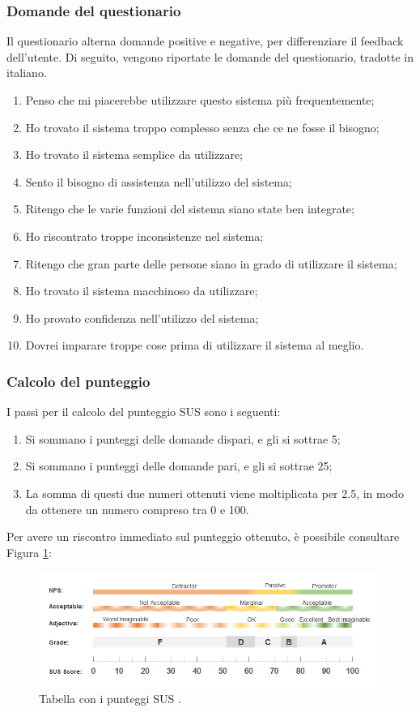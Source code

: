 \subsubsection{Domande del questionario}
Il questionario alterna domande positive e negative, per differenziare il feedback dell'utente.
Di seguito, vengono riportate le domande del questionario, tradotte in italiano.
\begin{enumerate}
  \item Penso che mi piacerebbe utilizzare questo sistema più frequentemente;
  \item Ho trovato il sistema troppo complesso senza che ce ne fosse il bisogno;
  \item Ho trovato il sistema semplice da utilizzare;
  \item Sento il bisogno di assistenza nell'utilizzo del sistema;
  \item Ritengo che le varie funzioni del sistema siano state ben integrate;
  \item Ho riscontrato troppe inconsistenze nel sistema;
  \item Ritengo che gran parte delle persone siano in grado di utilizzare il sistema;
  \item Ho trovato il sistema macchinoso da utilizzare;
  \item Ho provato confidenza nell'utilizzo del sistema;
  \item Dovrei imparare troppe cose prima di utilizzare il sistema al meglio.
\end{enumerate}

\subsubsection{Calcolo del punteggio}
I passi per il calcolo del punteggio SUS sono i seguenti:
\begin{enumerate}
  \item Si sommano i punteggi delle domande dispari, e gli si sottrae 5;
  \item Si sommano i punteggi delle domande pari, e gli si sottrae 25;
  \item La somma di questi due numeri ottenuti viene moltiplicata per 2.5, in modo da ottenere un numero compreso tra 0 e 100.
\end{enumerate}
Per avere un riscontro immediato sul punteggio ottenuto, è possibile consultare Figura \ref{fig:sus}:

\begin{figure}[h]
  \includegraphics[width=\linewidth]{img/sus.jpg}
  \caption{Tabella con i punteggi SUS \cite{sus}.}
  \label{fig:sus}
\end{figure}


